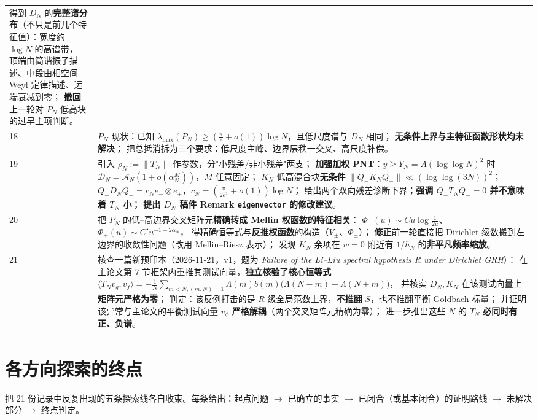 \documentclass[11pt,a4paper]{ctexart}
\newcommand{\Dk}{\mathcal{D}}
\newcommand{\Ak}{\mathcal{A}}
\newcommand{\al}{\alpha_{N}}
\begin{document}
\begin{longtable}{@{}p{1.05cm}p{13.6cm}@{}}
得到 $D_N$ 的\textbf{完整谱分布}（不只是前几个特征值）：宽度约 $\log N$ 的高谱带，
顶端由简谐振子描述、中段由相空间 Weyl 定律描述、远端衰减到零；
\textbf{撤回}上一轮对 $P_N$ 低高块的过早主项判断。\\
18 &
$P_N$ 现状：已知 $\lambda_{\max}(P_N)\ge(\frac{\pi}{e}+o(1))\log N$，且低尺度谱与 $D_N$ 相同；
\textbf{无条件上界与主特征函数形状均未解决}；
把总抵消拆为三个要求：低尺度主峰、边界层秩一交叉、高尺度补偿。\\
19 &
引入 $\rho_N:=\|T_N\|$ 作参数，分"小残差/非小残差"两支；
\textbf{加强加权 PNT}：$y\ge Y_N=A(\log\log N)^2$ 时
$\Dk_N=\Ak_N(1+o(\al^M))$，$M$ 任意固定；
$K_N$ 低高混合块\textbf{无条件} $\|Q_-K_NQ_+\|\ll(\log\log(3N))^2$；
$Q_-D_NQ_+=c_Ne_-\otimes e_+$，$c_N=(\frac{\pi}{2e^2}+o(1))\log N$；
给出两个双向残差诊断下界；\textbf{强调 $Q_-T_NQ_-=0$ 并不意味着 $T_N$ 小}；
\textbf{提出 $D_N$ 稿件 Remark \texttt{eigenvector} 的修改建议}。\\
20 &
把 $P_N$ 的低--高边界交叉矩阵元\textbf{精确转成 Mellin 权函数的特征相关}：
$\Phi_-(u)\sim C u\log\frac{1}{2u}$、$\Phi_+(u)\sim C'u^{-1-2\al}$，
得精确恒等式与\textbf{反推权函数}的构造（$V_\pm$、$\Phi_\pm$）；
\textbf{修正}前一轮直接把 Dirichlet 级数搬到左边界的收敛性问题（改用 Mellin--Riesz 表示）；
发现 $K_N$ 余项在 $w=0$ 附近有 $1/h_N$ 的\textbf{非平凡频率缩放}。\\
21 &
核查一篇新预印本（2026-11-21，v1，题为 \emph{Failure of the Li--Liu spectral hypothesis R under Dirichlet GRH}）：
在主论文第 7 节框架内重推其测试向量，\textbf{独立核验了核心恒等式}
$\langle T_Nv_g,v_f\rangle=-\frac1N\sum_{m<N,(m,N)=1}\Lambda(m)b(m)\bigl(\Lambda(N-m)-\Lambda(N+m)\bigr)$，
并核实 $D_N,K_N$ 在该测试向量上\textbf{矩阵元严格为零}；
判定：该反例打击的是 $R$ 级全局范数上界，\textbf{不推翻} $S$，也不推翻平衡 Goldbach 标量；
并证明该异常与主论文的平衡测试向量 $v_\phi$ \textbf{严格解耦}（两个交叉矩阵元精确为零）；
进一步推出这些 $N$ 的 $T_N$ \textbf{必同时有正、负谱}。\\
\bottomrule
\end{longtable}

\section{各方向探索的终点}\label{sec:endpoints}

把 21 份记录中反复出现的五条探索线各自收束。每条给出：起点问题 $\to$ 已确立的事实 $\to$
已闭合（或基本闭合）的证明路线 $\to$ 未解决部分 $\to$ 终点判定。
\end{document}
